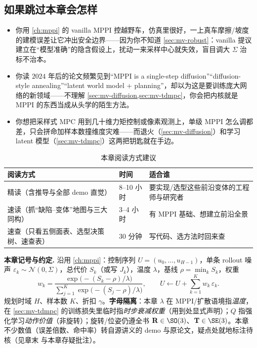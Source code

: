 \subsection*{如果跳过本章会怎样}
\begin{itemize}
  \item 你用 \cref{ch:mppi} 的 vanilla MPPI 控越野车，仿真里很好，一上真车摩擦/坡度的建模误差让它冲出安全边界——因为你不知道 \cref{sec:mv-robust}：vanilla 提议建立在“模型准确”的隐含假设上，扰动一来采样中心就失效，盲目调大 $\Sigma$ 治标不治本。
  \item 你读 $2024$ 年后的论文频繁见到“MPPI is a single-step diffusion”“diffusion-style annealing”“latent world model + planning”，却以为这是要训练庞大网络的新领域——不理解 \cref{sec:mv-diffusion,sec:mv-tdmpc}，你会把内核就是 MPPI 的东西当成从头学的陌生方法。
  \item 你想把采样式 MPC 用到几十维力矩控制或像素观测上，单级 MPPI 怎么调都差，只会拼命加样本数撞维度灾难——而退火（\cref{sec:mv-diffusion}）和学习 latent 模型（\cref{sec:mv-tdmpc}）这两把钥匙就在手边。
\end{itemize}

\begin{table}[H]\centering\small
\caption{本章阅读方式建议}
\label{tab:mv-reading}
\begin{tabular}{lll}
\toprule
阅读方式 & 时间 & 适合谁 \\
\midrule
精读（含推导与全部 demo 直觉） & 8--10 小时 & 要实现/选型这些前沿变体的工程师与研究者 \\
速读（抓“缺陷--变体”地图与三大同构） & 3--4 小时 & 有 MPPI 基础、想建立前沿全景 \\
速查（只看五侧面表、选型决策树、速查表） & 30 分钟 & 写代码、选方法时回来查 \\
\bottomrule
\end{tabular}
\end{table}

\begin{note}
\textbf{本章记号与约定.}\;
沿用 \cref{ch:mppi}：控制序列 $U=(u_0,\dots,u_{H-1})$，单条 rollout 噪声 $\varepsilon_k\sim\mathcal{N}(0,\Sigma)$，总代价 $S_k$（或写 $J_k$），温度 $\lambda$，基线 $\rho=\min_k S_k$，权重
\begin{equation}
  w_k=\frac{\exp\!\big(-(S_k-\rho)/\lambda\big)}{\sum_{j=1}^{K}\exp\!\big(-(S_j-\rho)/\lambda\big)},\qquad
  U\leftarrow U+\sum_{k=1}^{K}w_k\,\varepsilon_k.
  \label{eq:mv-mppi-update}
\end{equation}
规划时域 $H$、样本数 $K$、折扣 $\gamma$。\textbf{字母隔离}：本章 $\lambda$ 在 MPPI/扩散语境指\emph{温度}，在 \cref{sec:mv-tdmpc} 的训练损失里临时指\emph{时步衰减权重}（用到处显式声明）；$Q$ 指强化学习\emph{动作价值}（非旋转）；旋转/位姿仍遵全书 $\mathbf{R}\in\SO(3)$、$\mathbf{T}\in\SE(3)$。本章不少数值（误差倍数、命中率）转自源讲义的 demo 与原论文，疑点处就地标注待核（见章末  与本章存疑批注）。
\end{note}


